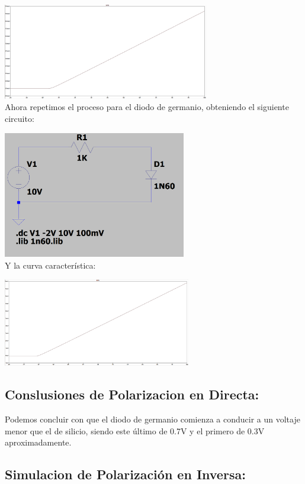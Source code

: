 \includegraphics[width=9cm]{imagenes/simulacion11.png}\\

Ahora repetimos el proceso para el diodo de germanio, obteniendo el siguiente circuito:

\includegraphics[width=8cm]{imagenes/Circuito2.png}\\

Y la curva característica:

\includegraphics[width=8.2cm]{imagenes/simulacion2.png}\\

\subsection{Conslusiones de Polarizacion en Directa:}

Podemos concluir con que el diodo de germanio comienza a conducir a un voltaje menor que el de silicio, siendo este último de 0.7V y el primero de 0.3V aproximadamente. 


\subsection{Simulacion de Polarización en Inversa:}

